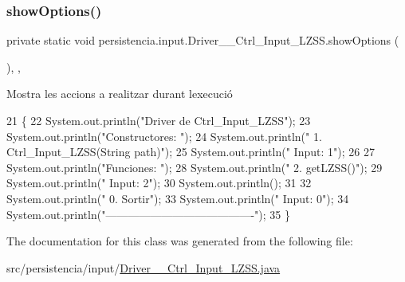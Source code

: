 \subsubsection{\texorpdfstring{show\+Options()}{showOptions()}}
{\footnotesize\ttfamily private static void persistencia.\+input.\+Driver\+\_\+\+\_\+\+Ctrl\+\_\+\+Input\+\_\+\+L\+Z\+S\+S.\+show\+Options (\begin{DoxyParamCaption}{ }\end{DoxyParamCaption})\hspace{0.3cm}{\ttfamily [inline]}, {\ttfamily [static]}, {\ttfamily [private]}}



Mostra les accions a realitzar durant l\textquotesingle{}execució 


\begin{DoxyCode}
21                                      \{
22         System.out.println(\textcolor{stringliteral}{"Driver de Ctrl\_Input\_LZSS"});
23         System.out.println(\textcolor{stringliteral}{"Constructores: "});
24         System.out.println(\textcolor{stringliteral}{"     1. Ctrl\_Input\_LZSS(String path)"});
25         System.out.println(\textcolor{stringliteral}{"     Input: 1"});
26 
27         System.out.println(\textcolor{stringliteral}{"Funciones: "});
28         System.out.println(\textcolor{stringliteral}{"     2. getLZSS()"});
29         System.out.println(\textcolor{stringliteral}{"     Input: 2"});
30         System.out.println();
31 
32         System.out.println(\textcolor{stringliteral}{"     0. Sortir"});
33         System.out.println(\textcolor{stringliteral}{"     Input: 0"});
34         System.out.println(\textcolor{stringliteral}{"----------------------------------------"});
35     \}
\end{DoxyCode}


The documentation for this class was generated from the following file\+:\begin{DoxyCompactItemize}
\item 
src/persistencia/input/\hyperlink{Driver____Ctrl__Input__LZSS_8java}{Driver\+\_\+\+\_\+\+Ctrl\+\_\+\+Input\+\_\+\+L\+Z\+S\+S.\+java}\end{DoxyCompactItemize}
